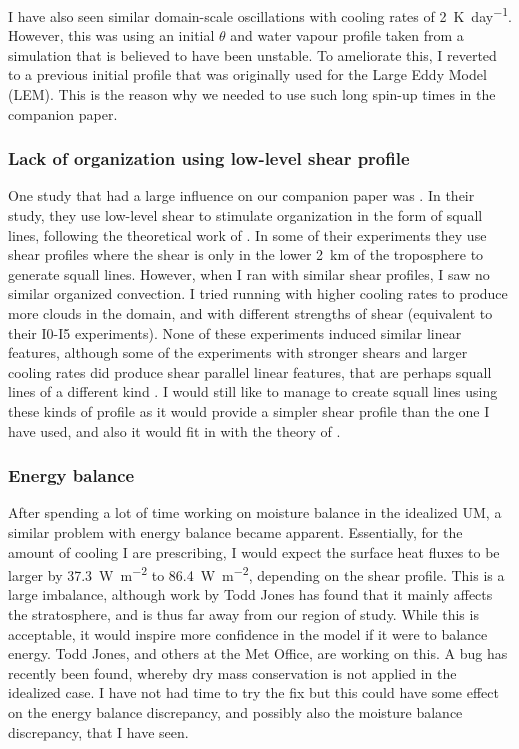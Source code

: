 \documentclass[11pt,a4paper]{article}
\begin{document}
I have also seen similar domain-scale oscillations with cooling rates of \SI{2}{K.day^{-1}}. However, this was using an initial $\theta$ and water vapour profile taken from a simulation that is believed to have been unstable. To ameliorate this, I reverted to a previous initial profile that was originally used for the Large Eddy Model (LEM). This is the reason why we needed to use such long spin-up times in the companion paper.

\subsubsection{Lack of organization using low-level shear profile}
One study that had a large influence on our companion paper was \cite{RE2001}. In their study, they use low-level shear to stimulate organization in the form of squall lines, following the theoretical work of \cite{RKW1988}. In some of their experiments they use shear profiles where the shear is only in the lower \SI{2}{km} of the troposphere to generate squall lines. However, when I ran with similar shear profiles, I saw no similar organized convection. I tried running with higher cooling rates to produce more clouds in the domain, and with different strengths of shear (equivalent to their I0-I5 experiments). None of these experiments induced similar linear features, although some of the experiments with stronger shears and larger cooling rates did produce shear parallel linear features, that are perhaps squall lines of a different kind \parencite{parker2007simulated}. I would still like to manage to create squall lines using these kinds of profile as it would provide a simpler shear profile than the one I have used, and also it would fit in with the theory of \cite{RKW1988}.

\subsubsection{Energy balance}
After spending a lot of time working on moisture balance in the idealized UM, a similar problem with energy balance became apparent. Essentially, for the amount of cooling I are prescribing, I would expect the surface heat fluxes to be larger by \SI{37.3}{W.m^{-2}} to \SI{86.4}{W.m^{-2}}, depending on the shear profile. This is a large imbalance, although work by Todd Jones has found that it mainly affects the stratosphere, and is thus far away from our region of study. While this is acceptable, it would inspire more confidence in the model if it were to balance energy. Todd Jones, and others at the Met Office, are working on this. A bug has recently been found, whereby dry mass conservation is not applied in the idealized case. I have not had time to try the fix but this could have some effect on the energy balance discrepancy, and possibly also the moisture balance discrepancy, that I have seen.
\end{document}
